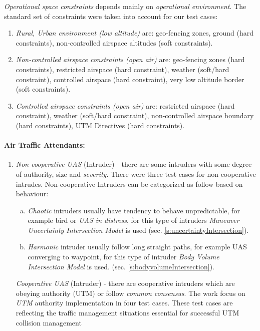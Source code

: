 \emph{Operational space constraints} depends mainly on \emph{operational environment}.  The standard set of constraints were taken into account for our test cases:
\begin{enumerate}
    \item \emph{Rural, Urban environment (low altitude)} are: geo-fencing zones, ground (hard constraints), non-controlled airspace altitudes (soft constraints).
    
    \item \emph{Non-controlled airspace constraints (open air)} are: geo-fencing zones (hard constraints), restricted airspace (hard constraint), weather (soft/hard constraint), controlled airspace (hard constraint), very low altitude border (soft constraints).
    
    \item \emph{Controlled airspace constraints (open air)} are: restricted airspace (hard constraint), weather (soft/hard constraint), non-controlled airspace boundary (hard constraints), UTM Directives (hard constraints).
\end{enumerate}

\newpage
\paragraph{Air Traffic Attendants:} 
\begin{enumerate}
    \item \emph{Non-cooperative UAS} (Intruder) -  there are some intruders with some degree of authority, size and \emph{severity}. There were three test cases for non-cooperative intrudes. Non-cooperative Intruders can be categorized as follow based on behaviour:
    \begin{enumerate}[a.]
        \item\emph{Chaotic} intruders usually have tendency to behave unpredictable, for example bird or \emph{UAS in distress}, for this type of intruders \emph{Maneuver Uncertainty  Intersection Model} is used (sec. \ref{s:uncertaintyIntersection}).
        
        \item\emph{Harmonic} intruder usually follow long straight paths, for example UAS converging to waypoint, for this type of intruder \emph{Body Volume Intersection Model} is used. (sec. \ref{s:bodyvolumeIntersection}).
    \end{enumerate}

    \emph{Cooperative UAS} (Intruder) -  there are cooperative intruders which are obeying authority (UTM) or follow \emph{common consensus}. The work focus on \emph{UTM} authority implementation in four test cases. These test cases are reflecting the traffic management situations essential for successful UTM collision management
\end{enumerate}
    
